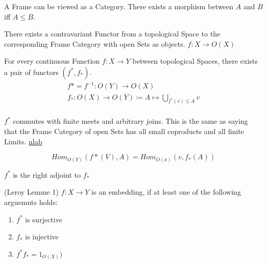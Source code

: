 \begin{lemma}[Frame]
    \label{lem:frame}
    A Frame can be viewed as a Category.
    There exists a morphism between $A$ and $B$ iff $A \le B$.
\end{lemma}

\begin{definition}
    \label{def:top_frame_func}
    There exists a contravariant Functor from a topological Space to the corresponding Frame Category with open Sets as objects. $f: X \rightarrow O(X)$
\end{definition}

\begin{definition}[$f^*$ and $f_*$]
    \label{def:f_star}
    For every continuous Function $f : X \rightarrow Y$ between topological Spaces, there exists a pair of functors $(f^*,f_*)$.
    \begin{gather*}
        f* = f^{-1} : O(Y) \rightarrow O(X)\\
        f_* : O(X) \rightarrow O(Y) \coloneqq A \mapsto \bigcup_{f^*(v) \le A} v\\
    \end{gather*}
\end{definition}

\begin{lemma}[$f^*$ commutes]
    \label{lem:f_star_comm}
    $f^*$ commutes with finite meets and arbitrary joins. This is the same as saying that the Frame Category of open Sets has all small coproducts and all finite Limits. \href{https://ncatlab.org/nlab/show/frame}{nlab}
\end{lemma}

\begin{lemma}[Homsets]
    \label{lem:f_star_homsets}
    \[Hom_{O(Y)}(f*(V), A) = Hom_{O(x)}(v, f_*(A))\]
\end{lemma}

\begin{lemma}[$f^* \dashv f_*$]
    \label{lem:f_star_adj}
    $f^*$ is the right adjoint to $f_*$
\end{lemma}

\begin{lemma}[Embedding]
(Leroy Lemme 1)
    \label{lem:embedding}
    $f: X \rightarrow Y$ is an embedding, if at least one of the following arguemnts holds:
    \begin{enumerate}
        \item $f^*$ is surjective
        \item $f_*$ is injective
        \item $f^{*}f_* = 1_{O(X)})$
    \end{enumerate}
\end{lemma}

